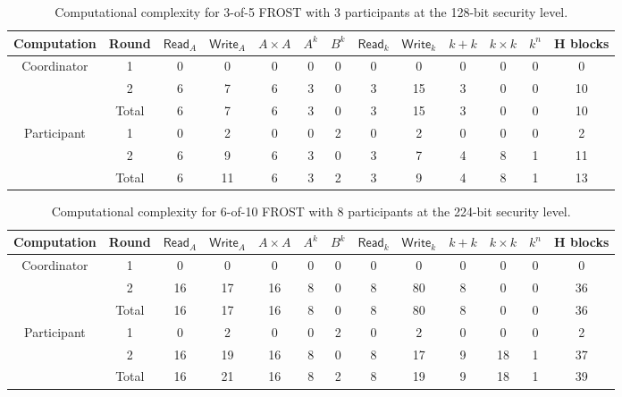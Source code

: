 \begin{table}
	\centering
	\begin{tabular}{c c c c c c c c c c c c c}
		\toprule
		Computation & Round & $\mathsf{Read}_A$ & $\mathsf{Write}_A$ & $A \times A$ & $A^k$  & $B^k$  & $\mathsf{Read}_k$ & $\mathsf{Write}_k$ & $k + k$ & $k \times k$ & $k^n$ & H blocks \\ \midrule
		Coordinator & 1 & 0 & 0 & 0 & 0 & 0 & 0 & 0 & 0 & 0 & 0 & 0 \\
		            & 2 & 6 & 7 & 6 & 3 & 0 & 3 & 15 & 3 & 0 & 0 & 10 \\
		            & Total & 6 & 7 & 6 & 3 & 0 & 3 & 15 & 3 & 0 & 0 & 10 \\
		\midrule
		Participant & 1 & 0 & 2 & 0 & 0 & 2 & 0 & 2 & 0 & 0 & 0 & 2 \\
		            & 2 & 6 & 9 & 6 & 3 & 0 & 3 & 7 & 4 & 8 & 1 & 11 \\
		            & Total & 6 & 11 & 6 & 3 & 2 & 3 & 9 & 4 & 8 & 1 & 13 \\
		\bottomrule
	\end{tabular}
	\caption{Computational complexity for 3-of-5 FROST with 3 participants at the 128-bit security level.}
\end{table}

\begin{table}
	\centering
	\begin{tabular}{c c c c c c c c c c c c c}
		\toprule
		Computation & Round & $\mathsf{Read}_A$ & $\mathsf{Write}_A$ & $A \times A$ & $A^k$  & $B^k$  & $\mathsf{Read}_k$ & $\mathsf{Write}_k$ & $k + k$ & $k \times k$ & $k^n$ & H blocks \\ \midrule
		Coordinator & 1 & 0 & 0 & 0 & 0 & 0 & 0 & 0 & 0 & 0 & 0 & 0 \\
		            & 2 & 16 & 17 & 16 & 8 & 0 & 8 & 80 & 8 & 0 & 0 & 36 \\
		            & Total & 16 & 17 & 16 & 8 & 0 & 8 & 80 & 8 & 0 & 0 & 36 \\
		\midrule
		Participant & 1 & 0 & 2 & 0 & 0 & 2 & 0 & 2 & 0 & 0 & 0 & 2 \\
		            & 2 & 16 & 19 & 16 & 8 & 0 & 8 & 17 & 9 & 18 & 1 & 37 \\
		            & Total & 16 & 21 & 16 & 8 & 2 & 8 & 19 & 9 & 18 & 1 & 39 \\
		\bottomrule
	\end{tabular}
	\caption{Computational complexity for 6-of-10 FROST with 8 participants at the 224-bit security level.}
\end{table}

